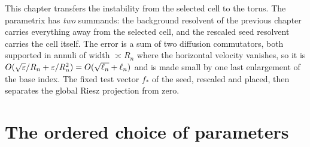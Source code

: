 
This chapter transfers the instability from the selected cell to the torus.  The
parametrix has \emph{two} summands: the background resolvent of the
previous chapter carries everything away from the selected cell, and the rescaled seed
resolvent carries the cell itself.  The error is a sum of two diffusion commutators, both
supported in annuli of width $\asymp R_n$ where the horizontal velocity vanishes, so it is
$O(\sqrt{\varepsilon}/R_n+\varepsilon/R_n^2)=O(\sqrt{\ell_n}+\ell_n)$ and is made small by one last
enlargement of the base index.  The fixed test vector $f_*$ of the seed, rescaled and
placed, then separates the global Riesz projection from zero.

\section{The ordered choice of parameters}

